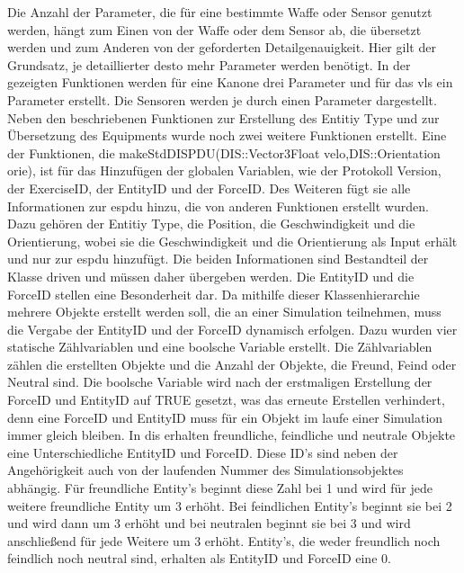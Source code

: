 Die Anzahl der Parameter, die für eine bestimmte Waffe oder Sensor genutzt werden, hängt zum Einen von der Waffe oder dem Sensor ab, die übersetzt werden und zum Anderen von der geforderten Detailgenauigkeit. Hier gilt der Grundsatz, je detaillierter desto mehr Parameter werden benötigt. In der gezeigten Funktionen werden für eine Kanone drei Parameter und für das \ac{vls} ein Parameter  erstellt. Die Sensoren werden je durch einen Parameter dargestellt.\\ 
Neben den beschriebenen Funktionen zur Erstellung des \glqq Entitiy Type\grqq{} und zur Übersetzung des Equipments wurde noch zwei weitere Funktionen erstellt. Eine der Funktionen, die  \glqq makeStdDISPDU(DIS::Vector3Float velo,DIS::Orientation orie)\grqq{}, ist für das Hinzufügen der globalen Variablen, wie der Protokoll Version, der ExerciseID, der EntityID und der ForceID. Des Weiteren fügt sie alle Informationen zur \ac{espdu} hinzu, die von anderen Funktionen erstellt wurden. Dazu gehören der \glqq Entitiy Type\grqq{}, die Position, die Geschwindigkeit und die Orientierung, wobei sie die Geschwindigkeit und die  Orientierung als Input erhält und nur zur \ac{espdu} hinzufügt. Die beiden Informationen sind Bestandteil der Klasse \glqq driven\grqq{} und müssen daher übergeben werden. Die EntityID und die ForceID stellen eine Besonderheit dar. Da mithilfe dieser Klassenhierarchie mehrere Objekte erstellt werden soll, die an einer Simulation teilnehmen, muss die Vergabe der EntityID und der ForceID dynamisch erfolgen.  
Dazu wurden vier statische Zählvariablen und eine boolsche Variable erstellt. Die Zählvariablen zählen die erstellten Objekte und die Anzahl der Objekte, die Freund, Feind oder Neutral sind. Die boolsche Variable wird nach der erstmaligen Erstellung der ForceID und EntityID auf \glqq TRUE\grqq{} gesetzt, was das erneute Erstellen verhindert, denn eine ForceID und EntityID  muss für ein Objekt im laufe einer Simulation immer gleich bleiben. In \ac{dis} erhalten freundliche, feindliche und neutrale Objekte eine Unterschiedliche EntityID und ForceID. Diese ID's sind neben der Angehörigkeit auch von der laufenden Nummer des Simulationsobjektes abhängig. Für freundliche Entity's beginnt diese Zahl bei 1 und wird für jede weitere freundliche Entity um 3 erhöht. Bei feindlichen Entity's beginnt sie bei 2 und wird dann um 3 erhöht und bei neutralen beginnt sie bei 3 und wird anschließend für jede Weitere um 3 erhöht. Entity's, die weder freundlich noch feindlich noch neutral sind, erhalten als EntityID und ForceID eine 0. 

